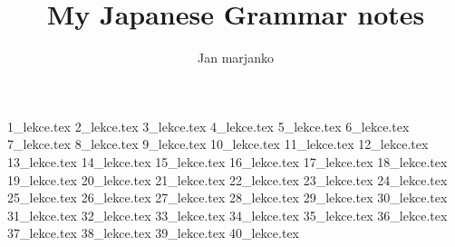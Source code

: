 \documentclass[article]{jlreq}
\title{My Japanese Grammar notes}
\author{Jan marjanko}
\begin{document}
\maketitle
\newpage
\tableofcontents
\newpage

{1_lekce.tex}%
{2_lekce.tex}%
{3_lekce.tex}%
{4_lekce.tex}%
{5_lekce.tex} %
{6_lekce.tex}%
{7_lekce.tex}%
{8_lekce.tex}%
{9_lekce.tex}%
{10_lekce.tex}%
{11_lekce.tex}%
{12_lekce.tex}%
{13_lekce.tex}%
{14_lekce.tex}%
{15_lekce.tex}%
{16_lekce.tex}%
{17_lekce.tex}%
{18_lekce.tex}
{19_lekce.tex}
{20_lekce.tex}%
{21_lekce.tex}
{22_lekce.tex}
{23_lekce.tex}
{24_lekce.tex}
{25_lekce.tex}%
{26_lekce.tex}%
{27_lekce.tex}%
{28_lekce.tex}%
{29_lekce.tex}%
{30_lekce.tex}%
{31_lekce.tex}%
{32_lekce.tex}%
{33_lekce.tex}%
{34_lekce.tex}%
{35_lekce.tex}%
{36_lekce.tex}%
{37_lekce.tex}%
{38_lekce.tex}%
{39_lekce.tex}%
{40_lekce.tex}%
\end{document}
